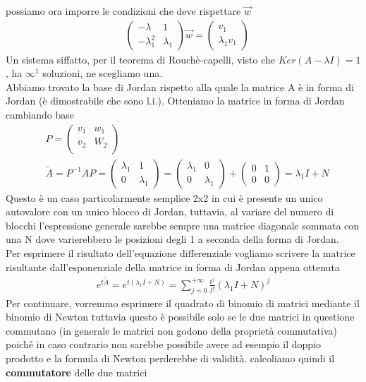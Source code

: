 \documentclass[10pt,a4paper]{article}
\begin{document}
possiamo ora imporre le condizioni che deve rispettare $\vec{w}$
\begin{align*}
	&\begin{pmatrix}
		-\lambda&1\\
		-\lambda_1^2&\lambda_1
	\end{pmatrix}\vec{w} = 
\begin{pmatrix}
	v_1\\
	\lambda_1 v_1
\end{pmatrix}
\end{align*}
Un sistema siffatto, per il teorema di Rouchè-capelli, visto che \(Ker(A-\lambda I)=1\), ha $\infty^1$ soluzioni, ne scegliamo una.\\
Abbiamo trovato la base di Jordan rispetto alla quale la matrice A è in forma di Jordan (è dimostrabile che sono l.i.). Otteniamo la matrice in forma di Jordan cambiando base
\begin{align*}
	&P =
	\begin{pmatrix}
		v_1&w_1\\
		v_2&W_2\\
	\end{pmatrix}\\
	&\tilde{A} = P^{-1}AP =
	\begin{pmatrix}
		\lambda_1& 1\\
		0&\lambda_1
	\end{pmatrix}=
	\begin{pmatrix}
		\lambda_1& 0\\
		0&\lambda_1
	\end{pmatrix}+
	\begin{pmatrix}
		0& 1\\
		0&0
	\end{pmatrix}=\lambda_1 I + N
\end{align*} 
Questo è un caso particolarmente semplice 2x2 in cui è presente un unico autovalore con un unico blocco di Jordan, tuttavia, al variare del numero di blocchi l'espressione generale sarebbe sempre una matrice diagonale sommata con una N dove varierebbero le posizioni degli 1 a seconda della forma di Jordan.\\
Per esprimere il risultato dell'equazione differenziale vogliamo scrivere la matrice risultante dall'esponenziale della matrice in forma di Jordan appena ottenuta
\begin{align*}
	e^{t\tilde{A}} = e^{t(\lambda_1 I + N)} = \sum_{j=0}^{+\infty} \frac{t^j}{j!}(\lambda_1 I +N)^j
\end{align*}
Per continuare, vorremmo esprimere il quadrato di binomio di matrici mediante il binomio di Newton tuttavia questo è possibile solo se le due matrici in questione commutano (in generale le matrici non godono della proprietà commutativa) poiché in caso contrario non sarebbe possibile avere ad esempio il doppio prodotto e la formula di Newton perderebbe di validità. calcoliamo quindi il \textbf{commutatore} delle due matrici
\end{document}
